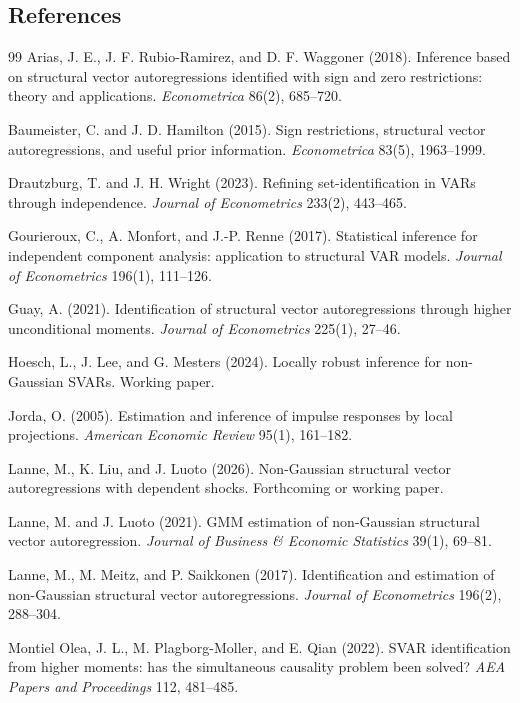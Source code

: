\documentclass[11pt]{article}
\theoremstyle{definition}
\theoremstyle{plain}
\theoremstyle{remark}
\begin{document}
\subsection*{References}
\begin{thebibliography}{99}
Arias, J. E., J. F. Rubio-Ramirez, and D. F. Waggoner (2018).  Inference based on structural vector autoregressions identified with sign and zero restrictions: theory and applications.  \emph{Econometrica} 86(2), 685--720.

Baumeister, C. and J. D. Hamilton (2015).  Sign restrictions, structural vector autoregressions, and useful prior information.  \emph{Econometrica} 83(5), 1963--1999.

Drautzburg, T. and J. H. Wright (2023).  Refining set-identification in VARs through independence.  \emph{Journal of Econometrics} 233(2), 443--465.

Gourieroux, C., A. Monfort, and J.-P. Renne (2017).  Statistical inference for independent component analysis: application to structural VAR models.  \emph{Journal of Econometrics} 196(1), 111--126.

Guay, A. (2021).  Identification of structural vector autoregressions through higher unconditional moments.  \emph{Journal of Econometrics} 225(1), 27--46.

Hoesch, L., J. Lee, and G. Mesters (2024).  Locally robust inference for non-Gaussian SVARs.  Working paper.

Jorda, O. (2005).  Estimation and inference of impulse responses by local projections.  \emph{American Economic Review} 95(1), 161--182.

Lanne, M., K. Liu, and J. Luoto (2026).  Non-Gaussian structural vector autoregressions with dependent shocks.  Forthcoming or working paper.

Lanne, M. and J. Luoto (2021).  GMM estimation of non-Gaussian structural vector autoregression.  \emph{Journal of Business \& Economic Statistics} 39(1), 69--81.

Lanne, M., M. Meitz, and P. Saikkonen (2017).  Identification and estimation of non-Gaussian structural vector autoregressions.  \emph{Journal of Econometrics} 196(2), 288--304.

Montiel Olea, J. L., M. Plagborg-Moller, and E. Qian (2022).  SVAR identification from higher moments: has the simultaneous causality problem been solved?  \emph{AEA Papers and Proceedings} 112, 481--485.


\end{thebibliography}
\end{document}
